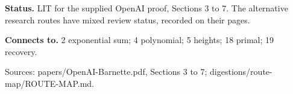 \textbf{Status.} LIT for the supplied OpenAI proof, Sections 3 to 7. The alternative research routes have mixed review status, recorded on their pages.

\textbf{Connects to.} 2 exponential sum; 4 polynomial; 5 heights; 18 primal; 19 recovery.

{\footnotesize\raggedright Sources: papers/\allowbreak{}OpenAI-Barnette.pdf, Sections 3 to 7;\allowbreak{} digestions/\allowbreak{}route-map/\allowbreak{}ROUTE-MAP.md.\par}
